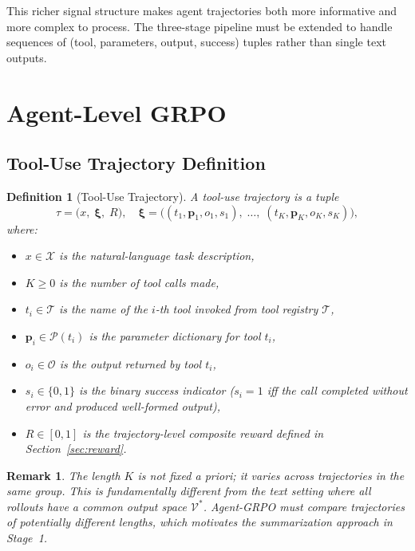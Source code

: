 \documentclass[11pt]{article}
\newtheorem{definition}{Definition}
\newtheorem{remark}{Remark}
\begin{document}
This richer signal structure makes agent trajectories both more informative
and more complex to process. The three-stage pipeline must be extended to
handle sequences of (tool, parameters, output, success) tuples rather than
single text outputs.

\section{Agent-Level GRPO}
\label{sec:agentgrpo}

\subsection{Tool-Use Trajectory Definition}
\label{sec:trajectories}

\begin{definition}[Tool-Use Trajectory]
\label{def:trajectory}
A tool-use trajectory is a tuple
\begin{equation}
    \tau = \bigl(x,\;\bm{\xi},\;R\bigr),
    \quad \bm{\xi} = \bigl((t_1, \bm{p}_1, o_1, s_1),\;\ldots,\;(t_K, \bm{p}_K, o_K, s_K)\bigr),
    \label{eq:trajectory}
\end{equation}
where:
\begin{itemize}[leftmargin=1.5em]
    \item $x \in \mathcal{X}$ is the natural-language task description,
    \item $K \geq 0$ is the number of tool calls made,
    \item $t_i \in \mathcal{T}$ is the name of the $i$-th tool invoked from
          tool registry $\mathcal{T}$,
    \item $\bm{p}_i \in \mathcal{P}(t_i)$ is the parameter dictionary for
          tool $t_i$,
    \item $o_i \in \mathcal{O}$ is the output returned by tool $t_i$,
    \item $s_i \in \{0, 1\}$ is the binary success indicator ($s_i = 1$ iff
          the call completed without error and produced well-formed output),
    \item $R \in [0, 1]$ is the trajectory-level composite reward defined in
          Section~\ref{sec:reward}.
\end{itemize}
\end{definition}

\begin{remark}
The length $K$ is not fixed a priori; it varies across trajectories in the
same group. This is fundamentally different from the text setting where all
rollouts have a common output space $\mathcal{V}^*$. Agent-GRPO must compare
trajectories of potentially different lengths, which motivates the
summarization approach in Stage~1.
\end{remark}
\end{document}
